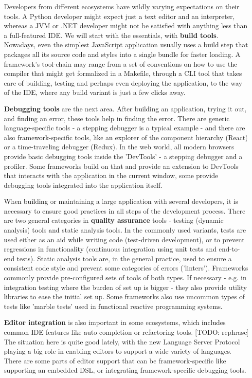 \documentclass[english,odsaz]{fitthesis}
\begin{document}
Developers from different ecosystems have wildly varying expectations on their
tools. A Python developer might expect just a text editor and an interpreter,
whereas a JVM or .NET developer might not be satisfied with anything less than a
full-featured IDE. We will start with the essentials, with \textbf{build
tools}. Nowadays, even the simplest JavaScript application usually uses a build
step that packages all its source code and styles into a single bundle for
faster loading. A framework's tool-chain may range from a set of conventions on
how to use the compiler that might get formalized in a Makefile, through a CLI
tool that takes care of building, testing and perhaps even deploying the
application, to the way of the IDE, where any build variant is just a few clicks
away.

\textbf{Debugging tools} are the next area. After building an application, trying it out,
and finding an error, these tools help in finding the error. There are generic
language-specific tools - a stepping debugger is a typical example - and there
are also framework-specific tools, like an explorer of the component hierarchy
(React) or a time-traveling debugger (Redux). In the web world, all modern
browsers provide basic debugging tools inside the 'DevTools' - a stepping
debugger and a profiler. Some frameworks build on that and provide an extension
to DevTools that interacts with the application in the current window, some
provide debugging tools integrated into the application itself.

When building or maintaining a large application with several developers, it is
necessary to ensure good practices in all steps of the development
process. There are two general categories in \textbf{quality assurance} tools - testing
(dynamic analysis) tools and static analysis tools. In the commonly used
variants, tests are used either as an aid while writing code (test-driven
development), or to prevent regressions in functionality (continuous integration
using unit tests and end-to-end tests). Static analysis tools are, in the
general practice, used to ensure a consistent code style and prevent some
categories of errors ('linters'). Frameworks commonly provide pre-configured
sets of tools of both types. If necessary - e.g. in integration testing where
the burden of set up is bigger - they also provide utility libraries to ease the
initial set up. Some frameworks also use uncommon types of tests like 'marble
tests' used in functional reactive programming systems.

\textbf{Editor integration} is also important in some ecosystems, which includes common
IDE features like auto-completion or refactoring tools. [TODO: rephrase] The situation here is
quite good lately, with the new Language Server Protocol \cite{lsp} playing a big
role in enabling editors to support a wide variety of languages. There are some
parts of editor support that can be framework-specific like supporting an embedded
DSL, or integrating framework-specific debugging tools.
\end{document}
